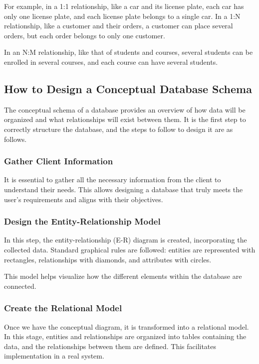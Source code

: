 \documentclass{article}
\begin{document}
For example, in a 1:1 relationship, like a car and its license plate, each car has only one license plate, and each license plate belongs to a single car. In a 1:N relationship, like a customer and their orders, a customer can place several orders, but each order belongs to only one customer.

In an N:M relationship, like that of students and courses, several students can be enrolled in several courses, and each course can have several students.

\subsection{How to Design a Conceptual Database Schema}

The conceptual schema of a database provides an overview of how data will be organized and what relationships will exist between them. It is the first step to correctly structure the database, and the steps to follow to design it are as follows.

\subsubsection{Gather Client Information}

It is essential to gather all the necessary information from the client to understand their needs. This allows designing a database that truly meets the user's requirements and aligns with their objectives.

\subsubsection{Design the Entity-Relationship Model}

In this step, the entity-relationship (E-R) diagram is created, incorporating the collected data. Standard graphical rules are followed: entities are represented with rectangles, relationships with diamonds, and attributes with circles.

This model helps visualize how the different elements within the database are connected.

\subsubsection{Create the Relational Model}

Once we have the conceptual diagram, it is transformed into a relational model. In this stage, entities and relationships are organized into tables containing the data, and the relationships between them are defined. This facilitates implementation in a real system.
\end{document}
